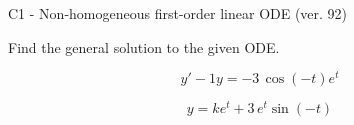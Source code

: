 \begin{exercise}
  \begin{exerciseTitle}C1 - Non-homogeneous first-order linear ODE (ver. 92)\end{exerciseTitle}
  \begin{exerciseStatement}
    
Find the general solution to the given ODE.

    
\[y'-1y= -3 \, \cos\left(-t\right) e^{t}\]

  \end{exerciseStatement}
  \begin{exerciseAnswer}
    
\[y= k e^{t} + 3 \, e^{t} \sin\left(-t\right)\]

  \end{exerciseAnswer}
\end{exercise}